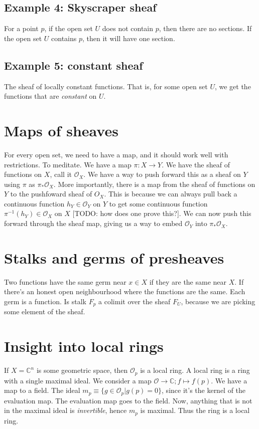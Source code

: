 \documentclass{book}
\renewcommand{\O}{\ensuremath{\mathcal{O}}}
\theoremstyle{definition}
\begin{document}
\subsection{Example 4: Skyscraper sheaf}
For a point $p$, if the open set $U$ does not contain $p$, then there are no sections.
If the open set $U$ contains $p$, then it will have one section.

\subsection{Example 5: constant sheaf}      
The sheaf of locally constant functions. That is, for some open set $U$, we 
get the functions that are \emph{constant} on $U$.

\section{Maps of sheaves}           
For every open set, we need to have a map, and it should work well with restrictions.
To meditate. We have a map $\pi: X \rightarrow Y$. We have the sheaf of functions
on $X$, call it $\O_X$. We have a way to push forward this as a 
sheaf on $Y$ using $\pi$ as $\pi_* \O_X$. More importantly, there is 
a map from the sheaf of functions on $Y$ to the pushfoward sheaf of $O_X$.  This is
because we can always pull back a continuous function $h_Y \in \O_Y$ on
$Y$ to get some continuous
function $\pi^{-1} (h_Y) \in \O_X$ on $X$ [TODO: how does one prove this?]. We 
can now push this forward through the sheaf map, giving us a way to embed
$\O_Y$ into $\pi_* \O_X$.

\section{Stalks and germs of presheaves}                                          

Two functions have the same germ near $x \in X$ if they are the same near $X$.
If there's an honest open neighbourhood where the functions are the same.
Each germ is a function. Is stalk $F_p$ a colimit over the sheaf $F_U$, because
we are picking some element of the sheaf.

\section{Insight into local rings}

If $X =\mathbb C^n$ is some geometric space, then $\O _p$ is a local ring. A local
ring is a ring with a single maximal ideal. We consider a map $\O \rightarrow \mathbb C; f \mapsto f(p)$.
We have a map to a field. The ideal $m_p \equiv \{ g \in \O_p | g(p) = 0 \}$, since
it's the kernel of the evaluation map. The evaluation map goes to the field.
Now, anything that is not in the maximal ideal is \emph{invertible}, hence
$m_p$ is maximal. Thus the ring is a local ring. 
\end{document}
